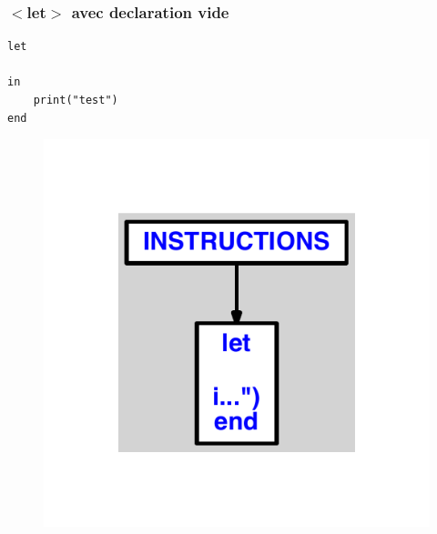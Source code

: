\documentclass{article}
\begin{document}
\subsubsection{$ < $let$ > $ avec declaration vide}
\begin{lstlisting}
let

in
	print("test")
end
\end{lstlisting}
\newpage
\begin{figure}[H]
\centering
\includegraphics[max width=\textwidth]{ast/ast_270.pdf}
\end{figure}
\newpage
\end{document}
